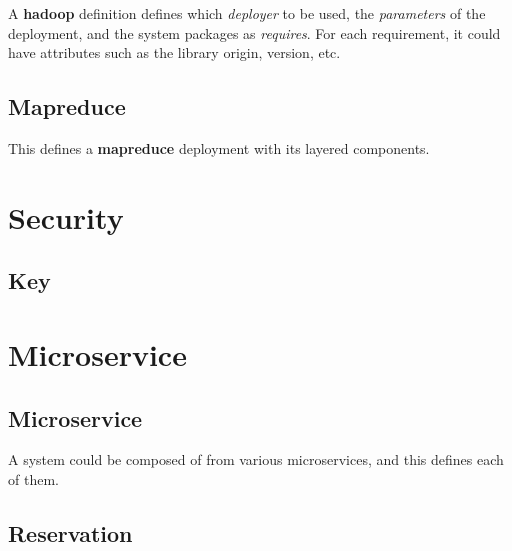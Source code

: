 \documentclass[9pt,twocolumn,twoside]{styles/osajnl}
\begin{document}
A \textbf{hadoop} definition defines which \textit{deployer} to be used,
the \textit{parameters} of the deployment, and the system packages as
\textit{requires}. For each requirement, it could have attributes such
as the library origin, version, etc.



\subsection{Mapreduce}

This defines a \textbf{mapreduce} deployment with its layered
components.


\section{Security}

\subsection{Key}


\section{Microservice}

\subsection{Microservice}

A system could be composed of from various microservices, and this defines
each of them.



\subsection{Reservation}
\end{document}

